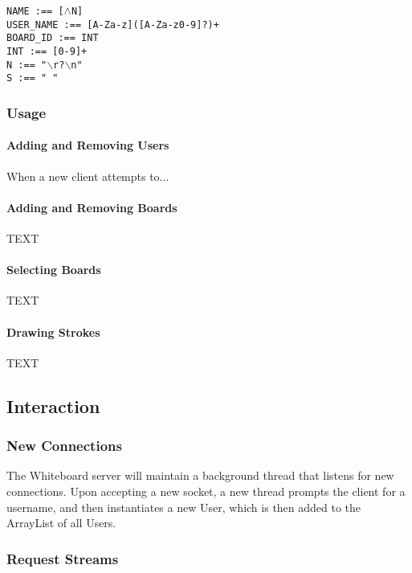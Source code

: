 \texttt{NAME :== [$\wedge$N]}\\
\texttt{USER\_NAME :== [A-Za-z]([A-Za-z0-9]?)+}\\
\texttt{BOARD\_ID :== INT}\\

\texttt{INT :== [0-9]+}\\
\texttt{N :== "$\backslash$r?$\backslash$n"}\\
\texttt{S :== " "}\\

\setlength{\parindent}{15pt} %

\subsubsection{Usage}

\paragraph{Adding and Removing Users} When a new client attempts to...

\paragraph{Adding and Removing Boards} TEXT

\paragraph{Selecting Boards} TEXT

\paragraph{Drawing Strokes} TEXT

\subsection{Interaction}

\subsubsection{New Connections}

The Whiteboard server will maintain a background thread that listens for new connections. Upon accepting a new socket, a new thread prompts the client for a username, and then instantiates a new User, which is then added to the ArrayList of all Users.

\subsubsection{Request Streams}


